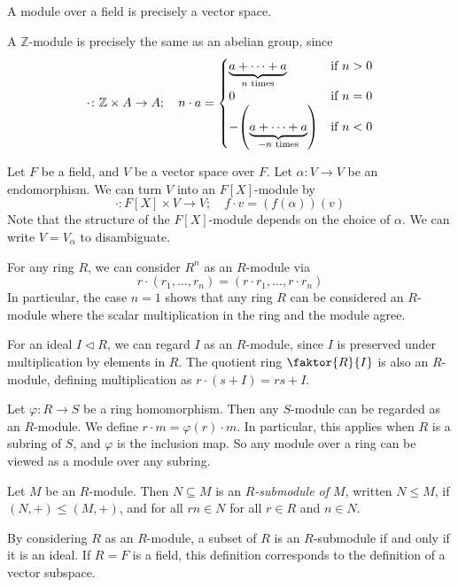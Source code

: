 \begin{example}
	A module over a field is precisely a vector space.

	A \( \mathbb Z \)-module is precisely the same as an abelian group, since
	\[
		\cdot \colon \mathbb Z \times A \to A;\quad n \cdot a = \begin{cases}
			\underbrace{a + \dots + a}_{n \text{ times}}         & \text{if } n > 0 \\
			0                                                    & \text{if } n = 0 \\
			-\qty(\underbrace{a + \dots + a}_{-n \text{ times}}) & \text{if } n < 0
		\end{cases}
	\]

	Let \( F \) be a field, and \( V \) be a vector space over \( F \).
	Let \( \alpha \colon V \to V \) be an endomorphism.
	We can turn \( V \) into an \( F[X] \)-module by
	\[
		\cdot \colon F[X] \times V \to V;\quad f \cdot v = (f(\alpha))(v)
	\]
	Note that the structure of the \( F[X] \)-module depends on the choice of \( \alpha \).
	We can write \( V = V_\alpha \) to disambiguate.

	For any ring \( R \), we can consider \( R^n \) as an \( R \)-module via
	\[
		r \cdot (r_1, \dots, r_n) = (r \cdot r_1, \dots, r \cdot r_n)
	\]
	In particular, the case \( n = 1 \) shows that any ring \( R \) can be considered an \( R \)-module where the scalar multiplication in the ring and the module agree.

	For an ideal \( I \triangleleft R \), we can regard \( I \) as an \( R \)-module, since \( I \) is preserved under multiplication by elements in \( R \).
	The quotient ring \( \faktor{R}{I} \) is also an \( R \)-module, defining multiplication as \( r \cdot (s+I) = rs + I \).

	Let \( \varphi \colon R \to S \) be a ring homomorphism.
	Then any \( S \)-module can be regarded as an \( R \)-module.
	We define \( r \cdot m = \varphi(r) \cdot m \).
	In particular, this applies when \( R \) is a subring of \( S \), and \( \varphi \) is the inclusion map.
	So any module over a ring can be viewed as a module over any subring.
\end{example}
\begin{definition}
	Let \( M \) be an \( R \)-module.
	Then \( N \subseteq M \) is an \textit{\( R \)-submodule of \( M \)}, written \( N \leq M \), if \( (N, +) \leq (M, +) \), and for all \( rn \in N \) for all \( r \in R \) and \( n \in N \).
\end{definition}
\begin{example}
	By considering \( R \) as an \( R \)-module, a subset of \( R \) is an \( R \)-submodule if and only if it is an ideal.
	If \( R = F \) is a field, this definition corresponds to the definition of a vector subspace.
\end{example}
